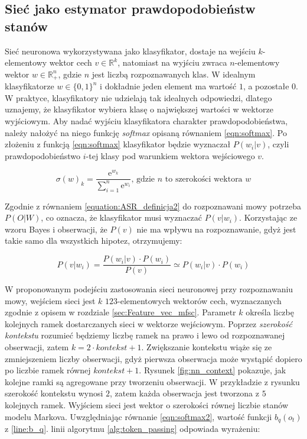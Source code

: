 \documentclass[11pt]{article}
\begin{document}
	\subsection{Sieć jako estymator prawdopodobieństw stanów }
	\label{sec:nn_estymator}
		Sieć neuronowa wykorzystywana jako klasyfikator, dostaje na wejściu $k$-elementowy wektor cech $v \in \mathbb{R}^k$, natomiast na wyjściu zwraca $n$-elementowy wektor $w \in \mathbb{R}_+^n$, gdzie $n$ jest liczbą rozpoznawanych klas. W idealnym klasyfikatorze $w \in \{0,1\}^n$ i dokładnie jeden element ma wartość $1$, a pozostałe $0$. W praktyce, klasyfikatory nie udzielają tak idealnych odpowiedzi, dlatego uznajemy, że klasyfikator wybiera klasę o największej wartości w wektorze wyjściowym. Aby nadać wyjściu klasyfikatora charakter prawdopodobieństwa, należy nałożyć na niego funkcję \textit{softmax} opisaną równaniem \ref{eqn:softmax}. Po złożeniu z funkcją \ref{eqn:softmax} klasyfikator będzie wyznaczał $P(w_i|v)$, czyli prawdopodobieństwo $i$-tej klasy pod warunkiem wektora wejściowego $v$.
		
		\begin{equation}
			\sigma(w)_k=\frac{\mathrm{e}^{w_k}}{\sum_{i=1}^{n} \mathrm{e}^{w_i}}
			\text{,   gdzie $n$ to szerokości wektora $w$}
			\label{eqn:softmax}
		\end{equation}
		
		Zgodnie z równaniem \ref{equation:ASR_definicja2} do rozpoznawani mowy potrzeba $P(O|W)$, co oznacza, że klasyfikator musi wyznaczać $P(v|w_i)$. Korzystając ze wzoru Bayes i obserwacji, że $P(v)$ nie ma wpływu na rozpoznawanie, gdyż jest takie samo dla wszystkich hipotez, otrzymujemy:
		
		\begin{equation}
			P(v|w_i) = \frac{P(w_i|v) \cdot P(w_i)}{P(v)}\simeq P(w_i|v) \cdot P(w_i)
			\label{eqn:softmax2}
		\end{equation}
		
		 W proponowanym podejściu zastosowania sieci neuronowej przy rozpoznawaniu mowy, wejściem sieci jest $k$ $123$-elementowych wektorów cech, wyznaczanych zgodnie z opisem w rozdziale \ref{sec:Feature_vec_mfsc}. Parametr $k$ określa liczbę kolejnych ramek dostarczanych sieci w wektorze wejściowym. Poprzez \textit{szerokość kontekstu} rozumieć będziemy liczbę ramek na prawo i lewo od rozpoznawanej obserwacji, zatem $k = 2 \cdot kontekst + 1$. Zwiększanie kontekstu wiąże się ze zmniejszeniem liczby obserwacji, gdyż pierwsza obserwacja może wystąpić dopiero po liczbie ramek równej $kontekst + 1$. Rysunek \ref{fig:nn_context} pokazuje, jak kolejne ramki są agregowane przy tworzeniu obserwacji. W przykładzie z rysunku szerokość kontekstu wynosi $2$, zatem każda obserwacja jest tworzona z $5$ kolejnych ramek. Wyjściem sieci jest wektor o szerokości równej liczbie stanów modelu Markova. Uwzględniając równanie \ref{eqn:softmax2}, wartość funkcji $b_q(o_t)$ z \ref{line:b_q}. linii algorytmu \ref{alg:token_passing} odpowiada wyrażeniu:
		 
\end{document}

